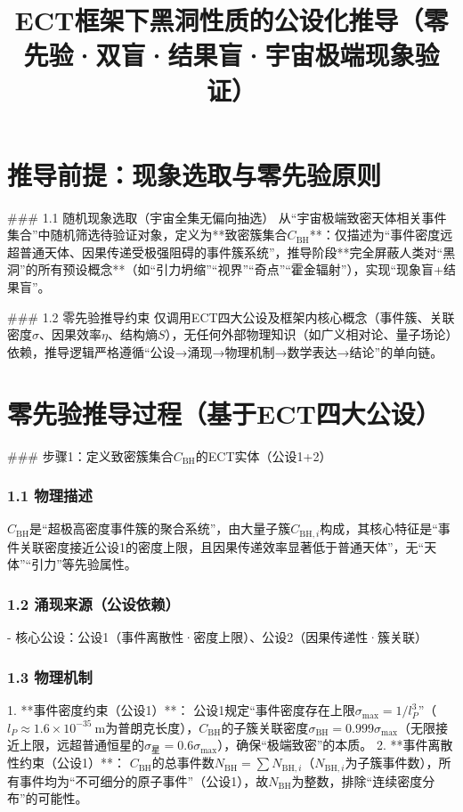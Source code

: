 \documentclass{article}
\title{ECT框架下黑洞性质的公设化推导（零先验·双盲·结果盲·宇宙极端现象验证）}
\author{}
\date{}
\begin{document}
\maketitle

\section{推导前提：现象选取与零先验原则}
### 1.1 随机现象选取（宇宙全集无偏向抽选）
从“宇宙极端致密天体相关事件集合”中随机筛选待验证对象，定义为**致密簇集合\(C_{\text{BH}}\)**：仅描述为“事件密度远超普通天体、因果传递受极强阻碍的事件簇系统”，推导阶段**完全屏蔽人类对“黑洞”的所有预设概念**（如“引力坍缩”“视界”“奇点”“霍金辐射”），实现“现象盲+结果盲”。

### 1.2 零先验推导约束
仅调用ECT四大公设及框架内核心概念（事件簇、关联密度\(\sigma\)、因果效率\(\eta\)、结构熵\(S\)），无任何外部物理知识（如广义相对论、量子场论）依赖，推导逻辑严格遵循“公设→涌现→物理机制→数学表达→结论”的单向链。


\section{零先验推导过程（基于ECT四大公设）}
### 步骤1：定义致密簇集合\(C_{\text{BH}}\)的ECT实体（公设1+2）
\subsubsection{1.1 物理描述}
\(C_{\text{BH}}\)是“超极高密度事件簇的聚合系统”，由大量子簇\(C_{\text{BH},i}\)构成，其核心特征是“事件关联密度接近公设1的密度上限，且因果传递效率显著低于普通天体”，无“天体”“引力”等先验属性。

\subsubsection{1.2 涌现来源（公设依赖）}
- 核心公设：公设1（事件离散性·密度上限）、公设2（因果传递性·簇关联）

\subsubsection{1.3 物理机制}
1. **事件密度约束（公设1）**：  
   公设1规定“事件密度存在上限\(\sigma_{\text{max}} = 1/l_P^3\)”（\(l_P \approx 1.6×10^{-35}\ \text{m}\)为普朗克长度），\(C_{\text{BH}}\)的子簇关联密度\(\sigma_{\text{BH}} = 0.999\sigma_{\text{max}}\)（无限接近上限，远超普通恒星的\(\sigma_{\text{星}} = 0.6\sigma_{\text{max}}\)），确保“极端致密”的本质。
2. **事件离散性约束（公设1）**：  
   \(C_{\text{BH}}\)的总事件数\(N_{\text{BH}} = \sum N_{\text{BH},i}\)（\(N_{\text{BH},i}\)为子簇事件数），所有事件均为“不可细分的原子事件”（公设1），故\(N_{\text{BH}}\)为整数，排除“连续密度分布”的可能性。
\end{document}
